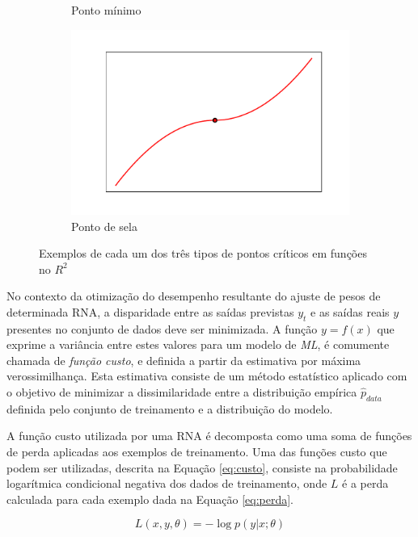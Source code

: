 \begin{figure}
\begin{subfigure}[h]{0.3\linewidth}
		\caption{Ponto mínimo}
		\label{fig:minimo}
	\end{subfigure}
	\hfill
	\begin{subfigure}[h]{0.3\linewidth}
		\includegraphics[width=\linewidth]{img/saddle}
		\caption{Ponto de sela}
		\label{fig:sela}
	\end{subfigure}%
	\caption{Exemplos de cada um dos três tipos de pontos críticos em funções no $R^2$}
	\label{fig:pontos_criticos}
\end{figure}

No contexto da otimização do desempenho resultante do ajuste de pesos de determinada RNA, a disparidade entre as saídas previstas $y_t$ e as saídas reais $y$ presentes no conjunto de dados deve ser minimizada. A função $y=f(x)$ que exprime a variância entre estes valores para um modelo de \emph{ML}, é comumente chamada de \emph{função custo}, e definida a partir da estimativa por máxima verossimilhança. Esta estimativa consiste de um método estatístico aplicado com o objetivo de minimizar a dissimilaridade entre a distribuição empírica $\hat{p}_{data}$ definida pelo conjunto de treinamento
e a distribuição do modelo.

A função custo utilizada por uma RNA é decomposta como uma soma de funções de perda aplicadas aos exemplos de treinamento. Uma das funções custo que podem ser utilizadas, descrita na Equação \ref{eq:custo}, consiste na probabilidade logarítmica condicional negativa dos dados de treinamento, onde $L$ é a perda calculada para cada exemplo dada na Equação \ref{eq:perda}.

\begin{equation}\label{eq:perda}
	L(x, y, \theta) = - \log p (y|x;\theta)
\end{equation}

